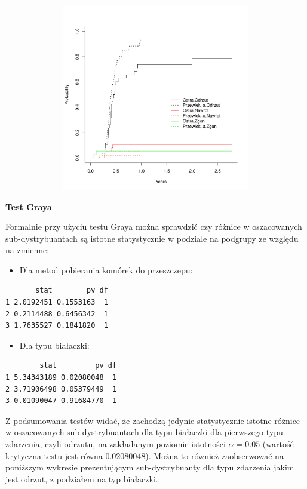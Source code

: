 \documentclass[]{article}
\begin{document}
\vspace{-22pt}

\includegraphics[width=16cm,height=8.2cm]{plot2.pdf} \newpage

\textbf{Test Graya}

Formalnie przy użyciu testu Graya można sprawdzić czy różnice w
oszacowanych sub-dystrybuantach są istotne statystycznie w podziale na
podgrupy ze względu na zmienne:

\begin{itemize}
\itemsep1pt\parskip0pt
\item
  Dla metod pobierania komórek do przeszczepu:
\end{itemize}

\begin{verbatim}
       stat        pv df
1 2.0192451 0.1553163  1
2 0.2114488 0.6456342  1
3 1.7635527 0.1841820  1
\end{verbatim}

\begin{itemize}
\itemsep1pt\parskip0pt
\item
  Dla typu białaczki:
\end{itemize}

\begin{verbatim}
        stat         pv df
1 5.34343189 0.02080048  1
2 3.71906498 0.05379449  1
3 0.01090047 0.91684770  1
\end{verbatim}

Z podsumowania testów widać, że zachodzą jedynie statystycznie istotne
różnice w oszacowanych sub-dystrybuantach dla typu białaczki dla
pierwszego typu zdarzenia, czyli odrzutu, na zakładanym poziomie
istotności \(\alpha=0.05\) (wartość krytyczna testu jest równa
\(0.02080048\)). Można to również zaobserwować na poniższym wykresie
prezentującym sub-dystrybuanty dla typu zdarzenia jakim jest odrzut, z
podziałem na typ białaczki.
\end{document}
